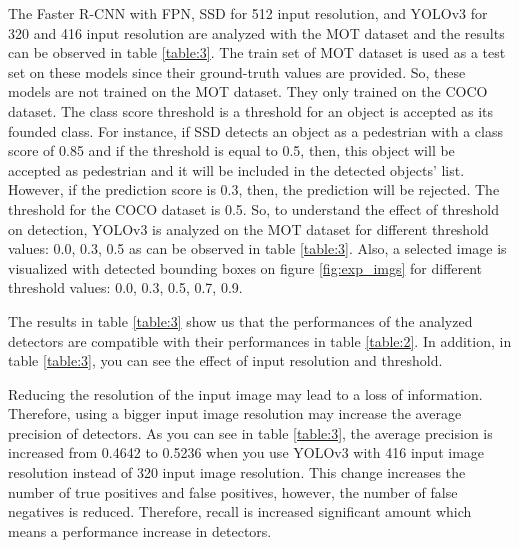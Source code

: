 \documentclass{article}
\begin{document}
\setlength{\parindent}{6ex}

\indent

The Faster R-CNN with FPN, SSD for 512 input resolution, and YOLOv3 for 320 and 416 input 
resolution are analyzed with the MOT dataset and the results can be observed in table 
\ref{table:3}. The train set of MOT dataset is used as a test set on these models since 
their ground-truth values are provided. So, these models are not trained on the MOT dataset. 
They only trained on the COCO dataset. The class score threshold is a threshold for an object 
is accepted as its founded class. For instance, if SSD detects an object as a pedestrian 
with a class score of 0.85 and if the threshold is equal to 0.5, then, this object will be 
accepted as pedestrian and it will be included in the detected objects' list. However, if 
the prediction score is 0.3, then, the prediction will be rejected. The threshold for 
the COCO dataset is 0.5. So, to understand the effect of threshold on detection, YOLOv3 is 
analyzed on the MOT dataset for different threshold values: 0.0, 0.3, 0.5 as can be observed 
in table \ref{table:3}. Also, a selected image is visualized with detected bounding boxes 
on figure \ref{fig:exp_imgs} for different threshold values: 0.0, 0.3, 0.5, 0.7, 0.9. \par

The results in table \ref{table:3} show us that the performances of the analyzed detectors 
are compatible with their performances in table \ref{table:2}. In addition, in table \ref{table:3}, 
you can see the effect of input resolution and threshold. \par 

Reducing the resolution of the input image may lead to a loss of information. Therefore, using a bigger input 
image resolution may increase the average precision of detectors. As you can see in table \ref{table:3}, 
the average precision is increased from 0.4642 to 0.5236 when you use YOLOv3 with 416 input image 
resolution instead of 320 input image resolution. This change increases the number of true positives and 
false positives, however, the number of false negatives is reduced. Therefore, recall is increased 
significant amount which means a performance increase in detectors. \par
\end{document}

